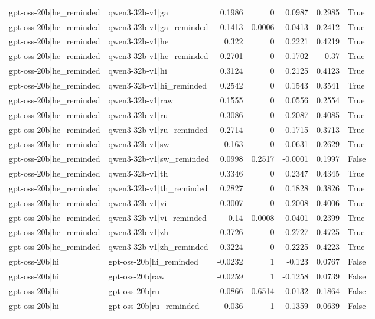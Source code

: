 \begin{table}
\begin{tabular}{l l r r r r l}
gpt-oss-20b|he_reminded & qwen3-32b-v1|ga & 0.1986 & 0 & 0.0987 & 0.2985 & True \\
gpt-oss-20b|he_reminded & qwen3-32b-v1|ga_reminded & 0.1413 & 0.0006 & 0.0413 & 0.2412 & True \\
gpt-oss-20b|he_reminded & qwen3-32b-v1|he & 0.322 & 0 & 0.2221 & 0.4219 & True \\
gpt-oss-20b|he_reminded & qwen3-32b-v1|he_reminded & 0.2701 & 0 & 0.1702 & 0.37 & True \\
gpt-oss-20b|he_reminded & qwen3-32b-v1|hi & 0.3124 & 0 & 0.2125 & 0.4123 & True \\
gpt-oss-20b|he_reminded & qwen3-32b-v1|hi_reminded & 0.2542 & 0 & 0.1543 & 0.3541 & True \\
gpt-oss-20b|he_reminded & qwen3-32b-v1|raw & 0.1555 & 0 & 0.0556 & 0.2554 & True \\
gpt-oss-20b|he_reminded & qwen3-32b-v1|ru & 0.3086 & 0 & 0.2087 & 0.4085 & True \\
gpt-oss-20b|he_reminded & qwen3-32b-v1|ru_reminded & 0.2714 & 0 & 0.1715 & 0.3713 & True \\
gpt-oss-20b|he_reminded & qwen3-32b-v1|sw & 0.163 & 0 & 0.0631 & 0.2629 & True \\
gpt-oss-20b|he_reminded & qwen3-32b-v1|sw_reminded & 0.0998 & 0.2517 & -0.0001 & 0.1997 & False \\
gpt-oss-20b|he_reminded & qwen3-32b-v1|th & 0.3346 & 0 & 0.2347 & 0.4345 & True \\
gpt-oss-20b|he_reminded & qwen3-32b-v1|th_reminded & 0.2827 & 0 & 0.1828 & 0.3826 & True \\
gpt-oss-20b|he_reminded & qwen3-32b-v1|vi & 0.3007 & 0 & 0.2008 & 0.4006 & True \\
gpt-oss-20b|he_reminded & qwen3-32b-v1|vi_reminded & 0.14 & 0.0008 & 0.0401 & 0.2399 & True \\
gpt-oss-20b|he_reminded & qwen3-32b-v1|zh & 0.3726 & 0 & 0.2727 & 0.4725 & True \\
gpt-oss-20b|he_reminded & qwen3-32b-v1|zh_reminded & 0.3224 & 0 & 0.2225 & 0.4223 & True \\
gpt-oss-20b|hi & gpt-oss-20b|hi_reminded & -0.0232 & 1 & -0.123 & 0.0767 & False \\
gpt-oss-20b|hi & gpt-oss-20b|raw & -0.0259 & 1 & -0.1258 & 0.0739 & False \\
gpt-oss-20b|hi & gpt-oss-20b|ru & 0.0866 & 0.6514 & -0.0132 & 0.1864 & False \\
gpt-oss-20b|hi & gpt-oss-20b|ru_reminded & -0.036 & 1 & -0.1359 & 0.0639 & False \\

\end{tabular}
\end{table}
